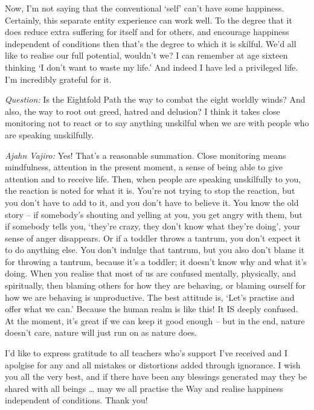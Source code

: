 Now, I'm not saying that the conventional `self' can't have some happiness. Certainly, this
separate entity experience can work well. To the degree that it does
reduce extra suffering for itself and for others, and encourage happiness independent of conditions then that's the degree to which it
is skilful. We'd all like to realise our full potential,
wouldn't we? I can remember at age sixteen thinking `I don't want to waste my
life.' And indeed I have led a privileged life. I'm incredibly grateful for it.

\bigskip

\emph{Question:} Is the Eightfold Path the way to combat the eight worldly winds? And
also, the way to root out greed, hatred and delusion? I think it takes close
monitoring not to react or to say anything unskilful when we are with people who
are speaking unskilfully.

\emph{Ajahn Vajiro:} Yes! That's a reasonable summation. Close monitoring means
mindfulness, attention in the present moment, a sense of being able to give
attention and to receive life. Then, when people are speaking unskilfully to
you, the reaction is noted for what it is. You're not trying to stop the
reaction, but you don't have to add to it, and you don't have to believe it. You
know the old story -- if somebody's shouting and yelling at you, you get angry
with them, but if somebody tells you, `they're crazy, they don't know what
they're doing', your sense of anger disappears. Or if a toddler throws a
tantrum, you don't expect it to do anything else. You don't indulge that
tantrum, but you also don't blame it for throwing a tantrum, because it's a
toddler; it doesn't know why and what it's doing. When you realise that most of
us are confused mentally, physically, and spiritually, then blaming others for
how they are behaving, or blaming ourself for how we are behaving is
unproductive. The best attitude is, `Let's practise and offer what we can.'
Because the human realm is like this! It IS deeply confused. At the moment, it's
great if we can keep it good enough -- but in the end, nature doesn't care,
nature will just run on as nature does.

I'd like to express gratitude to all teachers who's support I've received and I apolgise for any and all mistakes or distortions added through ignorance.
I wish you all the very best, and if there have been any blessings generated
may they be shared with all beings \ldots{} may we all practise the Way and
realise happiness independent of conditions. Thank you!

